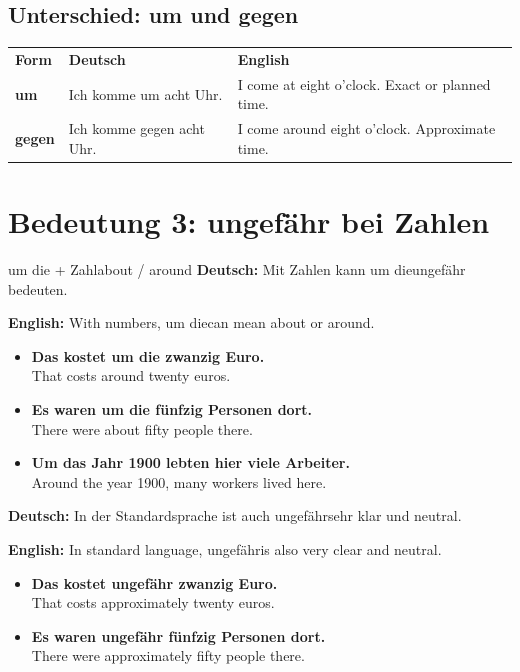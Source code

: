 \documentclass[a4paper,11pt]{article}
\newcommand{\GermanText}[1]{\textbf{Deutsch: }#1\par}
\newcommand{\EnglishText}[1]{{\small\color{SoftGray}\textbf{English: }#1\par}}
\newcommand{\ExampleItem}[2]{\item \textbf{#1}\\{\small\color{SoftGray}#2}}
\begin{document}
\subsection{Unterschied: um und gegen}

\begin{tabularx}{\textwidth}{>{\bfseries}p{}X X}
\rowcolor{HeaderBlueDark}
\color{white}\textbf{Form} & \color{white}\textbf{Deutsch} & \color{white}\textbf{English} \\
um & Ich komme um acht Uhr. & I come at eight o'clock. Exact or planned time. \\
gegen & Ich komme gegen acht Uhr. & I come around eight o'clock. Approximate time. \\
\end{tabularx}

\section{Bedeutung 3: ungefähr bei Zahlen}

\begin{grammarentry}{um die + Zahl}{about / around}
\GermanText{Mit Zahlen kann \glqq um die\grqq ungefähr bedeuten.}
\EnglishText{With numbers, \glqq um die\grqq can mean about or around.}
\end{grammarentry}

\begin{exbox}
\begin{itemize}
    \ExampleItem{Das kostet um die zwanzig Euro.}{That costs around twenty euros.}
    \ExampleItem{Es waren um die fünfzig Personen dort.}{There were about fifty people there.}
    \ExampleItem{Um das Jahr 1900 lebten hier viele Arbeiter.}{Around the year 1900, many workers lived here.}
\end{itemize}
\end{exbox}

\GermanText{In der Standardsprache ist auch \glqq ungefähr\grqq sehr klar und neutral.}
\EnglishText{In standard language, \glqq ungefähr\grqq is also very clear and neutral.}

\begin{exbox}
\begin{itemize}
    \ExampleItem{Das kostet ungefähr zwanzig Euro.}{That costs approximately twenty euros.}
    \ExampleItem{Es waren ungefähr fünfzig Personen dort.}{There were approximately fifty people there.}
\end{itemize}
\end{exbox}
\end{document}
